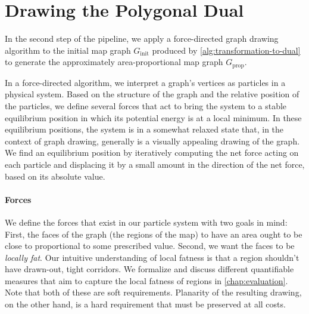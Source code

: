 \section{Drawing the Polygonal Dual}
\label{sect:drawing-the-dual}

In the second step of the pipeline, we apply a force-directed graph drawing algorithm to the initial map graph $G_\text{init}$ produced by \cref{alg:transformation-to-dual} to generate the approximately area-proportional map graph $G_\text{prop}$.

In a force-directed algorithm, we interpret a graph's vertices as particles in a physical system.
Based on the structure of the graph and the relative position of the particles, we define several forces that act to bring the system to a stable equilibrium position in which its potential energy is at a local minimum.
In these equilibrium positions, the system is in a somewhat relaxed state that, in the context of graph drawing, generally is a visually appealing drawing of the graph.
We find an equilibrium position by iteratively computing the net force acting on each particle and displacing it by a small amount in the direction of the net force, based on its absolute value.



\paragraph{Forces}


We define the forces that exist in our particle system with two goals in mind:
First, the faces of the graph (the regions of the map) to have an area ought to be close to proportional to some prescribed value.
Second, we want the faces to be \emph{locally fat}.
Our intuitive understanding of local fatness is that a region shouldn't have drawn-out, tight corridors.
We formalize and discuss different quantifiable measures that aim to capture the local fatness of regions in \cref{chap:evaluation}.
Note that both of these are soft requirements.
Planarity of the resulting drawing, on the other hand, is a hard requirement that must be preserved at all costs.

